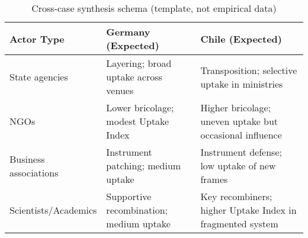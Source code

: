 \begin{table}[h!]
\centering
\caption{Cross-case synthesis schema (template, not empirical data)}
\label{tab:synthesis}
\begin{tabular}{@{}p{3.5cm}p{5cm}p{5cm}@{}}
\toprule
\textbf{Actor Type} & \textbf{Germany (Expected)} & \textbf{Chile (Expected)} \\ \midrule
State agencies & Layering; broad uptake across venues & Transposition; selective uptake in ministries \\
NGOs & Lower bricolage; modest Uptake Index & Higher bricolage; uneven uptake but occasional influence \\
Business associations & Instrument patching; medium uptake & Instrument defense; low uptake of new frames \\
Scientists/Academics & Supportive recombination; medium uptake & Key recombiners; higher Uptake Index in fragmented system \\ \bottomrule
\end{tabular}
\end{table}